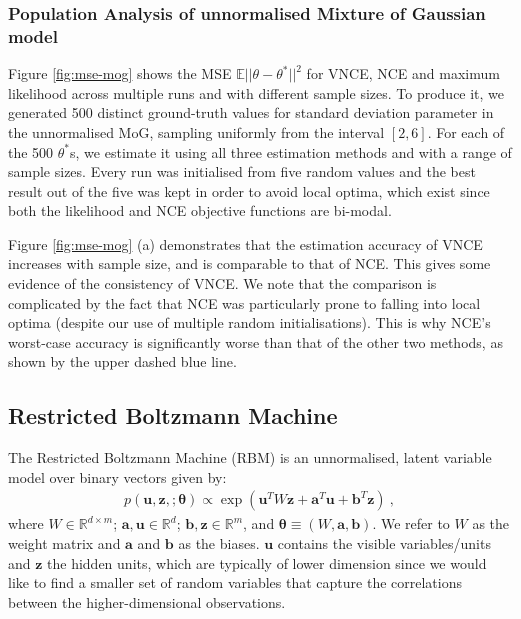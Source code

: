\documentclass[11pt, oneside]{article}
\newcommand{\thetab}{{\boldsymbol{\theta}}}
\renewcommand{\u}{{\mathbf u}}
\newcommand{\z}{{\mathbf z}}
\theoremstyle{definition}
\begin{document}
\subsubsection{Population Analysis of unnormalised Mixture of Gaussian model}
Figure \ref{fig:mse-mog} shows the MSE $\mathbb{E} ||\theta - \theta^*||^2$ for VNCE, NCE and maximum likelihood across multiple runs and with different sample sizes. To produce it, we generated 500 distinct ground-truth values for standard deviation parameter in the unnormalised MoG, sampling uniformly from the interval $[2, 6]$. For each of the 500 $\theta^*$s, we estimate it using all three estimation methods and with a range of sample sizes. Every run was initialised from five random values and the best result out of the five was kept in order to avoid local optima, which exist since both the likelihood and NCE objective functions are bi-modal.

Figure \ref{fig:mse-mog} (a) demonstrates that the estimation accuracy of VNCE increases with sample size, and is comparable to that of NCE. This gives some evidence of the consistency of VNCE. We note that the comparison is complicated by the fact that NCE was particularly prone to falling into local optima (despite our use of multiple random initialisations). This is why NCE's worst-case accuracy is significantly worse than that of the other two methods, as shown by the upper dashed blue line.


\subsection{Restricted Boltzmann Machine}
\label{sec:rbm}

The Restricted Boltzmann Machine (RBM) \citep{smolensky1986information} is an unnormalised, latent variable model over binary vectors given by:
\begin{align}
p(\u, \z, ; \thetab)  \propto \exp(\u^TW\z + \textbf{a}^{T}\u + \textbf{b}^T\z) \ ,
\label{eq:rbm}
\end{align}
where $W \in \mathbb{R}^{d \times m}$; $\textbf{a}, \u \in \mathbb{R}^{d}$; $\textbf{b}, \z \in \mathbb{R}^{m}$, and $\thetab \equiv (W, \textbf{a}, \textbf{b})$. We refer to $W$ as the weight matrix and $\textbf{a}$ and $\textbf{b}$ as the biases. $\u$ contains the visible variables/units and $\z$ the hidden units, which are typically of lower dimension since we would like to find a smaller set of random variables that capture the correlations between the higher-dimensional observations.
\end{document}

